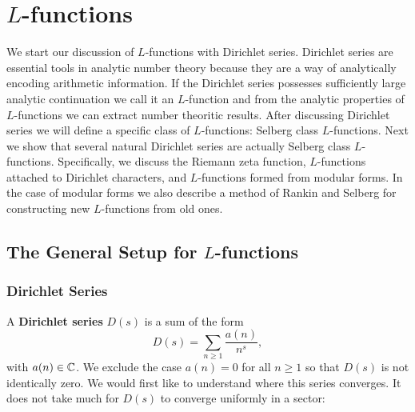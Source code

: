 \chapter{\texorpdfstring{$L$}{L}-functions}\label{ch:Standard_Class_L-functions}
  We start our discussion of $L$-functions with Dirichlet series. Dirichlet series are essential tools in analytic number theory because they are a way of analytically encoding arithmetic information. If the Dirichlet series possesses sufficiently large analytic continuation we call it an $L$-function and from the analytic properties of $L$-functions we can extract number theoritic results. After discussing Dirichlet series we will define a specific class of $L$-functions: Selberg class $L$-functions. Next we show that several natural Dirichlet series are actually Selberg class $L$-functions. Specifically, we discuss the Riemann zeta function, $L$-functions attached to Dirichlet characters, and $L$-functions formed from modular forms. In the case of modular forms we also describe a method of Rankin and Selberg for constructing new $L$-functions from old ones.
  \section{The General Setup for \texorpdfstring{$L$}{L}-functions}\label{sec:The_General_Setup_for_L-functions}
    \subsection*{Dirichlet Series}
      A \textbf{Dirichlet series} $D(s)$ is a sum of the form
      \[
        D(s) = \sum_{n \ge 1}\frac{a(n)}{n^{s}},
      \]
      with $a(n) \in \mathbb{C}$. We exclude the case $a(n) = 0$ for all $n \ge 1$ so that $D(s)$ is not identically zero. We would first like to understand where this series converges. It does not take much for $D(s)$ to converge uniformly in a sector:

